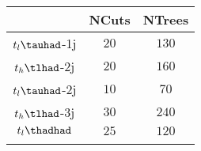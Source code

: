\centering
\begin{tabular}{ccc} \toprule\toprule
 & NCuts & NTrees\\\midrule
$t_{l}\tauhad$-1j & $20$ & $130$\\
$t_{h}\tlhad$-2j & $20$ & $160$\\
$t_{l}\tauhad$-2j & $10$ & $70$\\
$t_{h}\tlhad$-3j & $30$ & $240$\\
$t_{l}\thadhad$ & $25$ & $120$\\
\bottomrule\bottomrule\\
\end{tabular}
